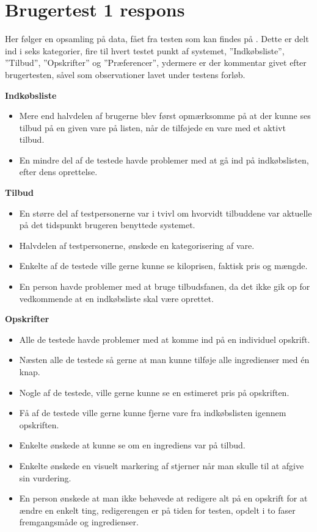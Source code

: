 \chapter{Brugertest 1 respons}\label{b:brugertestrespons}
Her følger en opsamling på data, fået fra testen som kan findes på .
Dette er delt ind i seks kategorier, fire til hvert testet punkt af systemet, ''Indkøbsliste'', ''Tilbud'', ''Opskrifter'' og ''Præferencer'', ydermere er der kommentar givet efter brugertesten, såvel som observationer lavet under testens forløb.

\textbf{Indkøbsliste} 
\begin{itemize}
   \item Mere end halvdelen af brugerne blev først opmærksomme på at der kunne ses tilbud på en given vare på listen, når de tilføjede en vare med et aktivt tilbud.
   \item En mindre del af de testede havde problemer med at gå ind på indkøbslisten, efter dens oprettelse.
\end{itemize}

\textbf{Tilbud} 
\begin{itemize}
   \item En større del af testpersonerne var i tvivl om hvorvidt tilbuddene var aktuelle på det tidspunkt brugeren benyttede systemet.
   \item Halvdelen af testpersonerne, ønskede en kategorisering af vare.
   \item Enkelte af de testede ville gerne kunne se kiloprisen, faktisk pris og mængde.
   \item En person havde problemer med at bruge tilbudsfanen, da det ikke gik op for vedkommende at en indkøbsliste skal være oprettet.
\end{itemize}

\textbf{Opskrifter} 
\begin{itemize}
   \item Alle de testede havde problemer med at komme ind på en individuel opskrift.
   \item Næsten alle de testede så gerne at man kunne tilføje alle ingredienser med én knap.
   \item Nogle af de testede, ville gerne kunne se en estimeret pris på opskriften.
   \item Få af de testede ville gerne kunne fjerne vare fra indkøbslisten igennem opskriften.
   \item Enkelte ønskede at kunne se om en ingrediens var på tilbud.
   \item Enkelte ønskede en visuelt markering af stjerner når man skulle til at afgive sin vurdering.
   \item En person ønskede at man ikke behøvede at redigere alt på en opskrift for at ændre en enkelt ting, redigerengen er på tiden for testen, opdelt i to faser fremgangsmåde og ingredienser.
\end{itemize}


